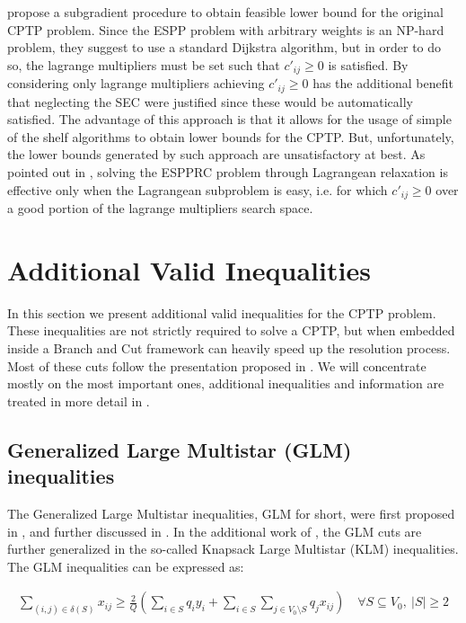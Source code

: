 \cite{beasley1989algorithm} propose a subgradient procedure to obtain feasible lower bound for the original CPTP problem.
Since the ESPP problem with arbitrary weights is an NP-hard problem, they suggest to use a standard Dijkstra algorithm, but in order to do so, the lagrange multipliers must be set such that $c'_{ij} \ge 0$ is satisfied.
By considering only lagrange multipliers achieving $c'_{ij} \ge 0$ has the additional benefit that neglecting the SEC were justified since these would be automatically satisfied.
The advantage of this approach is that it allows for the usage of simple of the shelf algorithms to obtain lower bounds for the CPTP.
But, unfortunately, the lower bounds generated by such approach are unsatisfactory at best.
As pointed out in \cite{righini2004dynamic}, solving the ESPPRC problem through Lagrangean relaxation is effective only when the Lagrangean subproblem is easy, i.e. for which $c'_{ij} \ge 0$ over a good portion of the lagrange multipliers search space.


\section{Additional Valid Inequalities}\label{sec:additional-valid-inequalities}

In this section we present additional valid inequalities for the CPTP problem.
These inequalities are not strictly required to solve a CPTP, but when embedded inside a Branch and Cut framework can heavily speed up the resolution process.
Most of these cuts follow the presentation proposed in \cite{Jepsen2014}.
We will concentrate mostly on the most important ones, additional inequalities and information are treated in more detail in \cite{Jepsen2014}.

\subsection{Generalized Large Multistar (GLM) inequalities}
The Generalized Large Multistar inequalities, GLM for short, were first proposed in \cite{gouveia_result_1995}, and further discussed in \cite{letchford2006projection}.
In the additional work of \cite{letchford_multistars_2002}, the GLM cuts are further generalized in the so-called Knapsack Large Multistar (KLM) inequalities.
The GLM inequalities can be expressed as:

\begin{equation}\label{eq:glm-inequality-v1}
	\begin{split}
		\sum_{(i, j) \in \delta(S)} x_{ij} \ge \frac{2}{Q} \left(  \sum_{i \in S} q_i y_i + \sum_{i \in S} \sum_{j \in V_0 \setminus S} q_j  x_{ij}\right) \quad \forall S \subseteq V_0,\ |S| \ge 2
	\end{split}
\end{equation}

